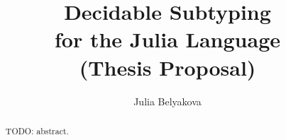 \title{Decidable Subtyping\\for the Julia Language\\ (Thesis Proposal)}

\author{Julia Belyakova}

\date{}

\maketitle


\begin{abstract}
  TODO: abstract.
\end{abstract}
